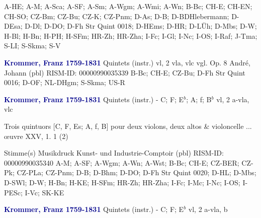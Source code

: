\documentclass[twocolumn]{book}
\begin{document}
\newline A-HE; A-M; A-Sca; A-SF; A-Sm; A-Wgm; A-Wmi; A-Wn; B-Bc; CH-E; CH-EN; CH-SO; CZ-Bm; CZ-Bu; CZ-K; CZ-Pnm; D-As; D-B; D-BDHlebermann; D-DEsa; D-Dl; D-DO; D-Fh  Str Quint 0018; D-HEms; D-HR; D-LÜh; D-Mbs; D-W; H-Bl; H-Bn; H-PH; H-SFm; HR-Zh; HR-Zha; I-Fc; I-Gl; I-Nc; I-OS; I-Raf; J-Tma; S-LI; S-Skma; S-V
\newline \par \vspace{7pt} \textcolor{darkblue}{\textbf{Krommer, Franz  1759-1831}}
\newline Quintets (instr.)
 vl, 2 vla, vlc
\newline vgl. Op. 8
\newline André, Johann  (pbl)
\newline RISM-ID: 00000990035339
\newline B-Bc; CH-E; CZ-Bu; D-Fh  Str Quint 0016; D-OF; NL-DHgm; S-Skma; US-R
\newline \par \vspace{7pt} \textcolor{darkblue}{\textbf{Krommer, Franz  1759-1831}}
\newline Quintets (instr.) - C; F; E$^b$; A; f; B$^b$
 vl, 2 a-vla, vlc
\newline \begin{itshape}Trois quintuors [C, F, Es; A, f, B] pour deux violons, deux altos \& violoncelle ... œuvre XXV, 1. 1 (2)\end{itshape} 
\newline \textcolor{darkblue}{}  Stimme(s)
\newline Musikdruck
\newline Kunst- und Industrie-Comptoir  (pbl)
\newline RISM-ID: 00000990035340
\newline A-M; A-SF; A-Wgm; A-Wn; A-Wst; B-Bc; CH-E; CZ-BER; CZ-Pk; CZ-PLa; CZ-Pnm; D-B; D-Bhm; D-DO; D-Fh  Str Quint 0020; D-HL; D-Mbs; D-SWl; D-W; H-Bn; H-KE; H-SFm; HR-Zh; HR-Zha; I-Fc; I-Mc; I-Nc; I-OS; I-PESc; I-Vc; SK-KE
\newline \par \vspace{7pt} \textcolor{darkblue}{\textbf{Krommer, Franz  1759-1831}}
\newline Quintets (instr.) - C; F; E$^b$
 vl, 2 a-vla, b
\end{document}
